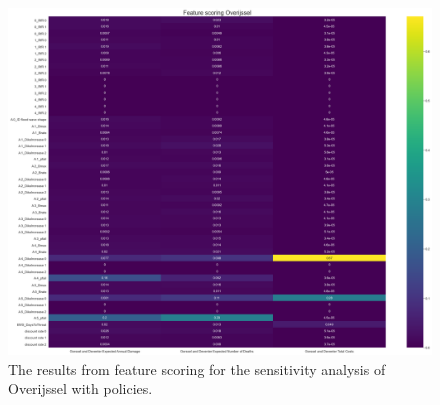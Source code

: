 \begin{figure}[h!]
    \centering
    \includegraphics[width=\textwidth]{report/figures/results/Feature_scoring_Overijssel_100scen.png}
    \caption{The results from feature scoring for the sensitivity analysis of Overijssel with policies.}
    \label{fig:feat-scor-o}
\end{figure}

\newpage